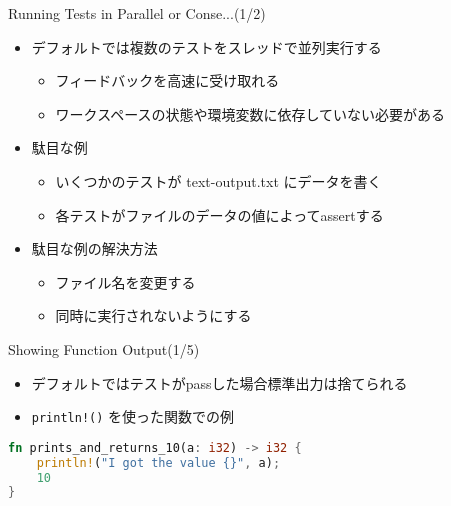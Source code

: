 \documentclass[cjk,14pt,xcolor=dvipsnames,table,dvipdfmx,professional font,t,fragile]{beamer}
\newenvironment{commandline}%
{\VerbatimEnvironment
  \begin{Sbox}\begin{minipage}{0.9\hsize}\begin{fontsize}{8}{8} \color{white} \begin{BVerbatim}}%
{\end{BVerbatim}\end{fontsize}\end{minipage}\end{Sbox}
  \setlength{\fboxsep}{8pt}

\vspace{6pt}%
\fcolorbox{white}{black}{\TheSbox}

\vspace{3pt}%
}
\begin{document}
\begin{frame}[containsverbatim]{Running Tests in Parallel or Conse...(1/2)}
 \begin{itemize}
  \item デフォルトでは複数のテストをスレッドで並列実行する
	\begin{itemize}
	 \item フィードバックを高速に受け取れる
	 \item ワークスペースの状態や環境変数に依存していない必要がある
	\end{itemize}
  \item 駄目な例
	\begin{itemize}
	 \item いくつかのテストが text-output.txt にデータを書く
	 \item 各テストがファイルのデータの値によってassertする
	\end{itemize}
  \item 駄目な例の解決方法
	\begin{itemize}
	 \item ファイル名を変更する
	 \item 同時に実行されないようにする
	\end{itemize}
 \end{itemize}
\end{frame}


\begin{frame}[containsverbatim]{Showing Function Output(1/5)}
\begin{itemize}
 \item デフォルトではテストがpassした場合標準出力は捨てられる
 \item \verb|println!()| を使った関数での例
\end{itemize}
 {\scriptsize
\begin{lstlisting}[language=Rust,style=boxed,style=colouredRust]
fn prints_and_returns_10(a: i32) -> i32 {
    println!("I got the value {}", a);
    10
}\end{lstlisting}}
\end{frame}
\end{document}

